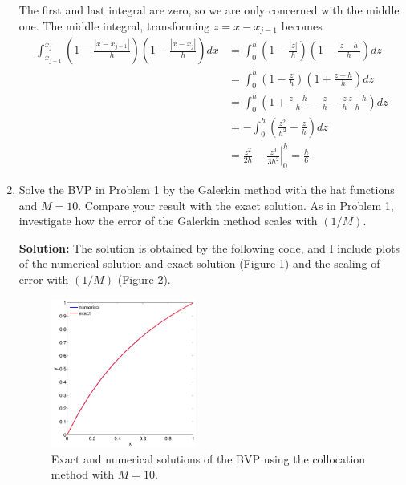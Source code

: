 \documentclass[11pt]{article}
\def\f{\frac }
\begin{document}
\begin{enumerate}

The first and last integral are zero, so we are only concerned with the middle one.
The middle integral, transforming $z = x-x_{j-1}$ becomes
\begin{align*} \int _{x_{j-1}} ^{x_{j}} \left ( 1- \f{|x-x_{j-1}|}{h}\right ) \left (  1- \f{|x-x_{j}|}{h}\right ) dx &=  \int _{0} ^{h} \left ( 1- \f{|z|}{h}\right ) \left (  1- \f{|z-h|}{h}\right ) dz \\
&=  \int _{0} ^{h} \left ( 1- \f{z}{h}\right ) \left (  1+ \f{z-h}{h}\right ) dz \\
&=  \int _{0} ^{h}\left ( 1 + \f{z-h}{h} - \f{z}{h} - \f{z}{h}\f{z-h}{h}\right ) dz \\
&=  -\int _{0} ^{h} \left ( \f{z^2}{h^2}-\f{z}{h}\right ) dz \\
&=  \left. \f{z^2}{2h}-\f{z^3}{3h^2} \right | _{0} ^{h} = \f{h}{6} \end{align*}




\item Solve the BVP in Problem 1 by the Galerkin method with the hat functions and $M=10$.
Compare your result with the exact solution.
As in Problem 1, investigate how the error of the Galerkin method scales with $(1/M)$.



\bigskip
\textbf{Solution:} The solution is obtained by the following code, and I include plots of the numerical solution and exact solution (Figure 1) and the scaling of error with $(1/M)$ (Figure 2).



\begin{figure}[h!]
  \centering
    \includegraphics[width=0.45\textwidth]{andy_hw09_prb01_01.pdf}
  \caption{Exact and numerical solutions of the BVP using the collocation method with $M=10$.}
\end{figure}


\end{enumerate}
\end{document}
